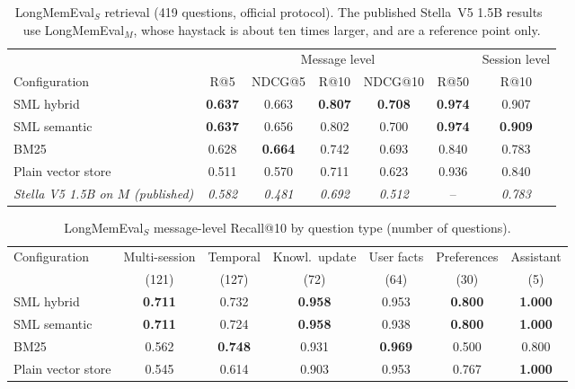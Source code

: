 \documentclass[11pt,a4paper]{article}
\newcommand{\sys}{SML}
\newcommand{\best}[1]{\textbf{#1}}
\begin{document}
\begin{table}[htbp]
\centering
\small
\caption{LongMemEval$_S$ retrieval (419 questions, official protocol). The published Stella~V5 1.5B
results~\cite{wu2025longmemeval,stella2024} use LongMemEval$_M$, whose haystack is about ten times larger,
and are a reference point only.}
\label{tab:lme}
\begin{tabular}{@{}lcccccc@{}}
\toprule
 & \multicolumn{5}{c}{Message level} & Session level \\
\cmidrule(lr){2-6}\cmidrule(l){7-7}
Configuration & R@5 & NDCG@5 & R@10 & NDCG@10 & R@50 & R@10 \\
\midrule
\sys{} hybrid & \best{0.637} & 0.663 & \best{0.807} & \best{0.708} & \best{0.974} & 0.907 \\
\sys{} semantic & \best{0.637} & 0.656 & 0.802 & 0.700 & \best{0.974} & \best{0.909} \\
BM25 & 0.628 & \best{0.664} & 0.742 & 0.693 & 0.840 & 0.783 \\
Plain vector store & 0.511 & 0.570 & 0.711 & 0.623 & 0.936 & 0.840 \\
\midrule
\textit{Stella V5 1.5B on $M$ (published)} & \textit{0.582} & \textit{0.481} & \textit{0.692} & \textit{0.512} & -- & \textit{0.783} \\
\bottomrule
\end{tabular}
\end{table}

\begin{table}[htbp]
\centering
\small
\caption{LongMemEval$_S$ message-level Recall@10 by question type (number of questions).}
\label{tab:lmetype}
\begin{tabular}{@{}lcccccc@{}}
\toprule
Configuration & Multi-session & Temporal & Knowl.\ update & User facts & Preferences & Assistant \\
 & (121) & (127) & (72) & (64) & (30) & (5) \\
\midrule
\sys{} hybrid & \best{0.711} & 0.732 & \best{0.958} & 0.953 & \best{0.800} & \best{1.000} \\
\sys{} semantic & \best{0.711} & 0.724 & \best{0.958} & 0.938 & \best{0.800} & \best{1.000} \\
BM25 & 0.562 & \best{0.748} & 0.931 & \best{0.969} & 0.500 & 0.800 \\
Plain vector store & 0.545 & 0.614 & 0.903 & 0.953 & 0.767 & \best{1.000} \\
\bottomrule
\end{tabular}
\end{table}
\end{document}
